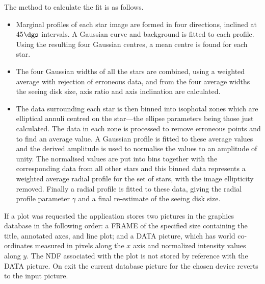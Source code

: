 {{{{         \sstitem
         The method to calculate the fit is as follows.
         \begin{itemize}
            \item  Marginal profiles of each star image are formed in four
            directions, inclined at 45$\dgs$ intervals.  A Gaussian curve
            and background is fitted to each profile.  Using the resulting
            four Gaussian centres, a mean centre is found for each star.
            \item The four Gaussian widths of all the stars are combined,
            using a weighted average with rejection of erroneous data, and
            from the four average widths the seeing disk size, axis ratio
            and axis inclination are calculated.
            \item The data surrounding each star is then binned into
            isophotal zones which are elliptical annuli centred on the
            star---the ellipse parameters being those just calculated.
            The data in each zone is processed to remove erroneous points
            and to find an average value.  A Gaussian profile is fitted to
            these average values and the derived amplitude is used to
            normalise the values to an amplitude of unity.  The normalised
            values are put into bins together with the corresponding data
            from all other stars and this binned data represents a
            weighted average radial profile for the set of stars, with the
            image ellipticity removed.  Finally a radial profile is fitted
            to these data, giving the radial profile parameter $\gamma$ and a
            final re-estimate of the seeing disk size.
         \end{itemize}

         \sstitem
         If a plot was requested the application stores two pictures in
         the graphics database in the following order: a FRAME of the
         specified size containing the title, annotated axes, and line
         plot; and a DATA picture, which has world co-ordinates measured
         in pixels along the $x$ axis and normalized intensity values along
         $y$.  The NDF associated with the plot is not stored by reference
         with the DATA picture.  On exit the current database picture for
         the chosen device reverts to the input picture.
      }
   }
   }}
